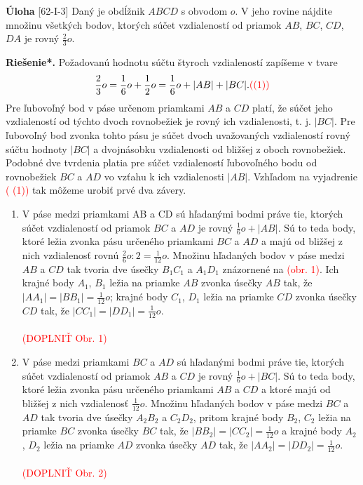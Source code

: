 \documentclass{article}
\newcommand{\rieh}{\textbf{Riešenie*.} }
\newcommand\todo[1]{\noindent\textcolor{red}{(#1)}}
\newcommand{\problem}[3]{
  \begin{tcolorbox}[breakable,notitle,boxrule=0pt,colback=light-gray,colframe=light-gray]
    \textbf{Úloha}
    [#1] #2
  \end{tcolorbox}
  \noindent#3
}
\begin{document}
\problem{62-I-3}{
Daný je obdĺžnik $ABCD$ s obvodom $o$. V jeho rovine nájdite množinu všetkých bodov, ktorých súčet vzdialeností od priamok $AB$, $BC$, $CD$, $DA$ je rovný $\frac{2}{3}o$. 
}{
\rieh Požadovanú hodnotu súčtu štyroch vzdialeností zapíšeme v tvare
$$ \frac{2}{3}o = \frac{1}{6}o +\frac{1}{2}o =\frac{1}{6}o + |AB| + |BC|. \todo{(1)}$$
Pre ľubovoľný bod v páse určenom priamkami $AB$ a $CD$ platí, že súčet jeho vzdialeností od týchto dvoch rovnobežiek je rovný ich vzdialenosti, t. j. $|BC|$. Pre ľubovoľný bod zvonka tohto pásu je súčet dvoch uvažovaných vzdialeností rovný súčtu hodnoty $|BC|$ a dvojnásobku vzdialenosti od bližšej z oboch rovnobežiek. Podobné dve tvrdenia platia pre súčet vzdialeností ľubovoľného bodu od rovnobežiek $BC$ a $AD$ vo vzťahu k ich vzdialenosti $|AB|$. Vzhľadom na vyjadrenie \todo{ (1)} tak môžeme urobiť prvé dva závery.

\begin{enumerate}[(1)]
    \item  V páse medzi priamkami AB a CD sú hľadanými bodmi práve tie, ktorých súčet vzdialeností od priamok $BC$ a $AD$ je rovný $\frac{1}{6}o + |AB|$. Sú to teda body, ktoré ležia zvonka pásu určeného priamkami $BC$ a $AD$ a majú od bližšej z nich vzdialenosť rovnú $\frac{2}{6}o : 2 = \frac{1}{12}o$. Množinu hľadaných bodov v páse medzi $AB$ a $CD$ tak tvoria dve úsečky $B_1 C_1$ a $A_1 D_1$ znázornené na \todo{obr. 1}. Ich krajné body $A_1$, $B_1$ ležia na priamke $AB$ zvonka úsečky $AB$ tak, že $|AA_1 | = |BB_1 | =\frac{1}{12}o$; krajné body $C_1$, $D_1$ ležia na priamke $CD$ zvonka úsečky $CD$ tak, že $|CC_1 | = |DD_1 | = \frac{1}{12}o$.\\
    \\
    \todo{DOPLNIŤ Obr. 1}
    
    \item V páse medzi priamkami $BC$ a $AD$ sú hľadanými bodmi práve tie, ktorých súčet vzdialeností od priamok $AB$ a $CD$ je rovný $\frac{1}{6}o + |BC|$. Sú to teda body, ktoré ležia zvonka pásu určeného priamkami $AB$ a $CD$ a ktoré majú od bližšej z nich vzdialenosť $\frac{1}{12}o$. Množinu hľadaných bodov v páse medzi $BC$ a $AD$ tak tvoria dve úsečky $A_2 B_2$ a $C_2 D_2$, pritom krajné body $B_2$, $C_2$ ležia na priamke $BC$ zvonka úsečky $BC$ tak, že $|BB_2 | = |CC_2 | =\frac{1}{12}o$ a krajné body $A_2$, $D_2$ ležia na priamke $AD$ zvonka úsečky $AD$ tak, že $|AA_2 | = |DD_2 | =\frac{1}{12}o$. \\
    \\
    \todo{DOPLNIŤ Obr. 2}


\end{enumerate}}
\end{document}
